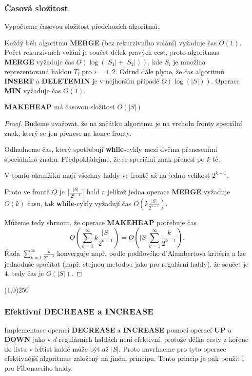 \documentclass[a4paper,12pt]{article}
\newenvironment{myproof}{
  \begin{proof}
    
  }{
  \end{proof}
  \begin{center}
   \line(1,0){250}
   \end{center}
  }
\begin{document}
\subsubsection{Časová složitost}
Vypočteme časovou složitost předchozích 
algoritmů. 

Každý běh 
algoritmu {\bf MERGE} (bez rekurzivního volání) vyžaduje čas 
$O(1)$. Počet rekurzivních volání je součet délek pravých 
cest, proto algoritmus {\bf MERGE} vyžaduje čas $O(\log(|S_
1|+|S_2|))$, 
kde $S_i$ je množina reprezentovaná haldou $T_i$ pro $i=1,2$.
Odtud dále plyne, že čas algoritmů {\bf INSERT} a 
{\bf DELETE\-MIN} je v 
nejhorším případě $O(\log(|S|))$. Operace {\bf MIN} vyžaduje 
čas $O(1)$. 

\begin{veta}
    {\bf MA\-KEHEAP} má časovou složitost $O(|S|)$
\end{veta}

\begin{myproof}
Budeme 
uvažovat, že na začátku algoritmu je na vrcholu fronty 
speciální znak, který se jen přenese na konec fronty. 

Odhadneme čas, který spotřebují {\bf while-}cykly mezi dvě\-ma 
přeneseními speciálního znaku. Předpokládejme, že se 
spe\-ciál\-ní znak přenesl po $k$-té.

V tomto okamžiku 
mají všechny haldy ve frontě až na jednu velikost $2^{
k-1}$. 

Proto ve frontě $Q$ je $\big\lceil \frac {|S|}{2^{k-1}}\big\rceil $ hald a jelikož jedna operace 
{\bf MERGE} vyžadu\-je $O(k)$ času, tak {\bf while}-cykly vyžadují 
čas $O(k\frac {|S|}{2^{k-1}})$. 

Můžeme tedy shrnout, že operace 
{\bf MAKEHEAP} potřebuje čas 
$$O(\sum_{k=1}^{\infty}k\frac {|S|}{2^{k-1}})=O(|S|\sum_{k=1}^{\infty}\frac 
k{2^{k-1}}).$$
Řada $\sum_{k=1}^{\infty}$$\frac k{2^{k-1}}$ konverguje např. podle podílového d'Alambertova 
kritéria a lze jednoduše spočítat (např. stejnou metodou 
jako pro regulární haldy), že součet je $4$, tedy čas je $O(|S|)$.
\end{myproof}

\subsubsection{Efektivní {\bf DECREASE} a {\bf INCREASE}}

Implementace operací {\bf DECREASE} a {\bf INCREASE} pomocí 
operací {\bf UP} a {\bf DOWN} jako v $d$-regulárních haldách není 
efektivní, protože délka cesty z kořene do listu v leftist haldě 
může být až $|S|$.  Proto navrhneme pro tyto operace 
efektivnější algoritmus založený na jiném principu.  Tento princip 
je pak použit i pro Fibonacciho haldy.  
\end{document}
